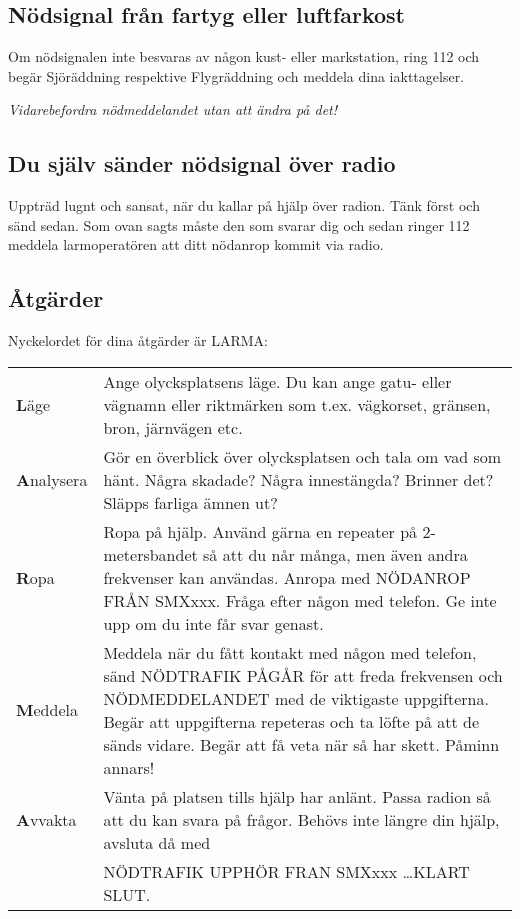 \subsection{Nödsignal från fartyg eller luftfarkost}

Om nödsignalen inte besvaras av någon kust- eller markstation, ring 112
och begär Sjöräddning respektive Flygräddning och meddela dina
iakttagelser.

\emph{Vidarebefordra nödmeddelandet utan att ändra på det!}

\subsection{Du själv sänder nödsignal över radio}

Uppträd lugnt och sansat, när du kallar på hjälp över radion. Tänk först och
sänd sedan. Som ovan sagts måste den som svarar dig och sedan ringer 112 meddela
larmoperatören att ditt nödanrop kommit via radio.

\subsection{Åtgärder}

Nyckelordet för dina åtgärder är LARMA:

\begin{tabular}{lp{9cm}}
	\textbf{L}äge &
	Ange olycksplatsens läge. Du kan ange gatu- eller vägnamn eller riktmärken som
	t.ex. vägkorset, gränsen, bron, järnvägen etc.
	\\
	\textbf{A}nalysera
	&
	Gör en överblick över
	olycksplatsen och tala om vad som hänt.  Några skadade? Några innestängda?
	Brinner det? Släpps farliga ämnen ut?
	\\
	\textbf{R}opa &
	Ropa på hjälp. Använd gärna en repeater på 2-metersbandet så att du når många,
	men även andra frekvenser kan användas.  Anropa med NÖDANROP FRÅN SMXxxx. Fråga
	efter någon med telefon. Ge inte upp om du inte får svar genast.
	\\
	\textbf{M}eddela &
	Meddela när du fått kontakt med någon med telefon, sänd NÖDTRAFIK PÅGÅR för att
	freda frekvensen och NÖDMEDDELANDET med de viktigaste uppgifterna. Begär att
	uppgifterna repeteras och ta löfte på att de sänds vidare. Begär att få veta när
	så har skett. Påminn annars!
	\\
	\textbf{A}vvakta &
	Vänta på platsen tills hjälp har anlänt. Passa radion så att du kan svara på
	frågor. Behövs inte längre din hjälp, avsluta då med\\
	& NÖDTRAFIK UPPHÖR FRAN SMXxxx \dots KLART SLUT.
\end{tabular}
